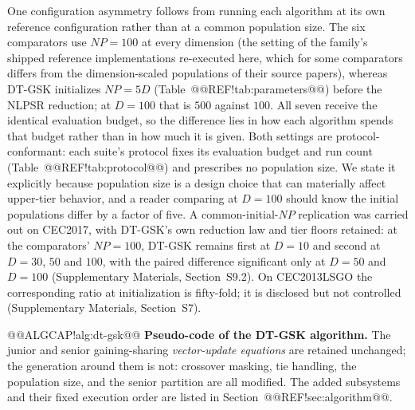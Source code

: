 \documentclass[10pt,a4paper]{article}
\newcommand{\dtgsk}{DT-GSK}
\begin{document}
One configuration asymmetry follows from running each algorithm at its own
reference configuration rather than at a common population size. The six
comparators use $NP=100$ at every dimension (the setting of the family's
shipped reference implementations re-executed here, which for some
comparators differs from the dimension-scaled populations of their source
papers), whereas \dtgsk{} initializes $NP=5D$ (Table~@@REF!tab:parameters@@)
before the NLPSR reduction; at $D=100$ that is $500$ against $100$. All seven
receive the identical evaluation budget, so the difference lies in how each
algorithm spends that budget rather than in how much it is given. Both
settings are protocol-conformant: each suite's protocol fixes its evaluation
budget and run count (Table~@@REF!tab:protocol@@) and prescribes no population
size. We state it
explicitly because population size is a design choice that can materially
affect upper-tier behavior, and a reader comparing at $D=100$ should
know the initial populations differ by a factor of five. A common-initial-$NP$
replication was carried out on CEC2017, with \dtgsk{}'s own reduction law and
tier floors retained: at the comparators' $NP = 100$, \dtgsk{} remains first
at $D = 10$ and second at $D = 30$, $50$ and $100$, with the paired difference
significant only at $D = 50$ and $D = 100$ (Supplementary Materials,
Section~S9.2). On CEC2013LSGO the corresponding ratio at initialization is
fifty-fold; it is disclosed but not controlled (Supplementary Materials,
Section~S7).































@@ALGCAP!alg:dt-gsk@@ \textbf{Pseudo-code of the DT-GSK algorithm.} The junior and senior
gaining-sharing \emph{vector-update equations} are retained unchanged; the
generation around them is not: crossover masking, tie handling, the population
size, and the senior partition are all modified. The added subsystems and their
fixed execution order are listed in Section~@@REF!sec:algorithm@@.
\end{document}
